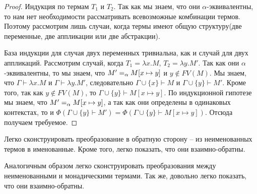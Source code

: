 \begin{proof}
  Индукция по термам $T_{1}$ и $T_{2}$. Так как мы знаем, что они $\alpha$-эквивалентны, то нам нет необходимости рассматривать всевозможные комбинации термов. Поэтому рассмотрим лишь случаи, когда термы имеют общую структуру(две переменные, две аппликации или две абстракции).

  База индукции для случая двух переменных тривиальна, как и случай для двух аппликаций. Рассмотрим случай, когда $T_{1} = \lambda x.M$, $T_{2} = \lambda y.M'$. Так как они $\alpha$-эквивалентны, то мы знаем, что $M' =_{\alpha} M[x \mapsto y]$ и $y \notin FV(M)$. Мы знаем, что $\Gamma \vdash \lambda x.M$ и $\Gamma \vdash \lambda y.M'$, следовательно $\Gamma \cup \{x\} \vdash M$ и $\Gamma \cup \{y\} \vdash M'$. Кроме того, так как $y \notin FV(M)$, то $\Gamma \cup \{y\} \vdash M[x \mapsto y]$. По индукционной гипотезе мы знаем, что $M' =_{\alpha} M[x \mapsto y]$, а так как они определены в одинаковых контекстах, то и $\Phi(\Gamma \cup \{y\} \vdash M') = \Phi(\Gamma \cup \{y\} \vdash M[x \mapsto y])$. Отсюда получаем требуемое.
\end{proof}

Легко сконструировать преобразование в обратную сторону -- из неименованных термов в именованные. Кроме того, легко показать, что они взаимно-обратны.

Аналогичным образом легко сконструировать преобразования между неименованными и монадическими термами. Так же, довольно легко показать, что они взаимно-обратны.
